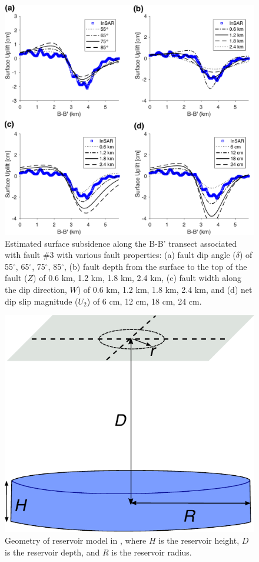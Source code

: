 \documentclass[draft,grl]{agutexSI2019}
\begin{document}
\begin{article}
\begin{figure}
\centering
\includegraphics[width=\textwidth]{figures/supplement/figureS9-fault-supplement2.pdf}
\caption{Estimated surface subsidence along the B-B' transect associated with fault \#3 with various fault properties: (a) fault dip angle ($ \delta $) of 55$ ^{\circ} $, 65$ ^{\circ} $, 75$ ^{\circ} $, 85$ ^{\circ} $, (b) fault depth from the surface to the top of the fault ($ Z $) of 0.6 km, 1.2 km, 1.8 km, 2.4 km, (c) fault width along the dip direction, $ W $) of 0.6 km, 1.2 km, 1.8 km, 2.4 km, and (d) net dip slip magnitude ($ U_2 $) of 6 cm, 12 cm, 18 cm, 24 cm.}
\label{fig:fault-supplement2}
\end{figure}

\begin{figure}
	\centering
	\includegraphics[width=.8\textwidth]{figures/supplement/figureS10-reservoir-geom.pdf}
	\caption{
	Geometry of reservoir model in , where $H$ is the reservoir height, $D$ is the reservoir depth, and $R$ is the reservoir radius.
	}
	\label{fig:model-reservoir-geom}
\end{figure}


\end{article}
\end{document}

